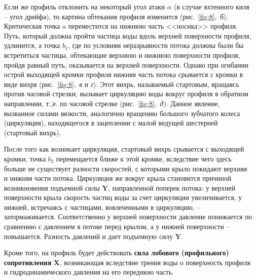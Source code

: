 \documentclass[a4paper, 12pt, twoside, final, book, russian, fittopage, cyremdash]{ncc}
\newcommand{\ve}[1]{\ensuremath{\mathbf{#1}}\xspace}
\begin{document}
Если же профиль отклонить на некоторый угол атаки $\alpha$ (в случае яхтенного киля \--- угол дрейфа), то картина обтекания профиля изменится (рис.~\ref{fig:8},~\textit{б}). Критическая точка $a$ переместится на нижнюю часть <<носика>> профиля. Путь, который должна пройти частица воды вдоль верхней поверхности профиля, удлинится, а точка $b_1$, где по условиям неразрывности потока должны были бы встретиться частицы, обтекающие верхнюю и нижнюю поверхности профиля, пройдя равный путь, оказывается на верхней поверхности. Однако при огибании острой выходящей кромки профиля нижняя часть потока срывается с кромки в виде вихря (рис.~\ref{fig:8},~\textit{в} и \textit{г}). Этот вихрь, называемый стартовым, вращаясь против часовой стрелки, вызывает циркуляцию воды вокруг профиля в обратном направлении, т.\=,е. по часовой стрелке (рис.~\ref{fig:8},~\textit{д}). Данное явление, вызванное силами вязкости, аналогично вращению большого зубчатого колеса (циркуляция), находящегося в зацеплении с малой ведущей шестерней (стартовый вихрь). 

После того как возникает циркуляция, стартовый вихрь срывается с выходящей кромки, точка $b_2$ перемещается ближе к этой кромке, вследствие чего здесь больше не существует разности скоростей, с которыми крыло покидают верхняя и нижняя части потока. Циркуляция же вокруг крыла становится причиной возникновения подъемной силы \ve Y, направленной поперек потока: у верхней поверхности крыла скорость частиц воды за счет циркуляции увеличивается, у нижней, встречаясь с частицами, вовлеченными в циркуляцию, \--- затормаживается. Соответственно у верхней поверхности давление понижается по сравнению с давлением в потоке перед крылом, а у нижней поверхности \--- повышается. Разность давлений и дает подъемную силу \ve Y. 

Кроме того, на профиль будет действовать \textbf{сила лобового (профильного) сопротивления} \ve X, возникающая вследствие трения воды о поверхность профиля и гидродинамического давления на его переднюю часть.
\end{document}
